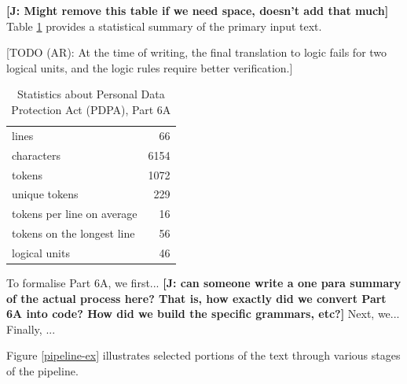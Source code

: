 \documentclass{IOS-Book-Article}
\newcommand{\todoj}[1]{{\color{red}\textbf{[J: #1]}}}
\begin{document}
\todoj{Might remove this table if we need space, doesn't add that much}
Table \ref{stats} provides a statistical summary of the primary input text.

[TODO (AR): At the time of writing, the final translation to logic fails for two logical units, and the logic rules require better verification.]

\begin{table}
  \begin{tabular}{|l|r|}
\hline
lines & 66 \\
characters & 6154 \\
tokens & 1072 \\
unique tokens & 229 \\
tokens per line on average & 16 \\
tokens on the longest line & 56 \\
logical units & 46 \\
\hline
  \end{tabular}
  \caption{Statistics about Personal Data Protection Act (PDPA), Part 6A}
  \label{stats}
\end{table}

To formalise Part 6A, we first...
 \todoj{ can someone write a one para summary of the actual process here? That is, how exactly did we convert Part 6A into code? How did we build the specific grammars, etc?}
  Next, we... Finally, ...

Figure \ref{pipeline-ex} illustrates selected portions of the text through various stages of the pipeline.
\end{document}
